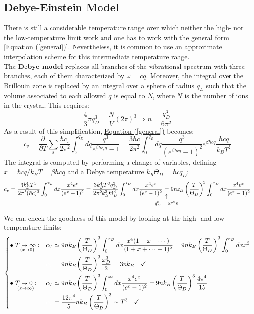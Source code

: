 \documentclass[10.75pt,a4paper,openright,bottom=2cm]{article}
\begin{document}
\subsection{Debye-Einstein Model}
There is still a considerable temperature range over which neither the high- nor the low-temperature limit work and one has to work with the general form [\hyperref[general]{Equation (\ref{general})}]. Nevertheless, it is common to use an approximate interpolation scheme for this intermediate temperature range.\\
The \textbf{Debye model} replaces all branches of the vibrational spectrum with three branches, each of them characterized by $\omega=cq$. Moreover, the integral over the  Brillouin zone is replaced by an integral over a sphere of radius $q_D$ such that the volume associated to each allowed $q$ is equal to $N$, where $N$ is the number of ions in the crystal. This requires:
\[
\frac{4}{3}\pi q_D^3=\frac{N}{V}(2\pi)^3\Rightarrow n=\frac{q_D^3}{6\pi^2}
\]
As a result of this simplification, \hyperref[general]{Equation (\ref{general})} becomes:
\[
c_v=\frac{\partial}{\partial T}\sum_s\frac{\hbar c_s}{2\pi^2}\int_0^{q_D}dq\frac{q^3}{e^{\beta\hbar c_sq}-1}=\frac{3\hbar c}{2\pi^2}\int_0^{q_D}dq\frac{q^3}{(e^{\beta\hbar cq}-1)^2}e^{\beta\hbar cq}\frac{\hbar cq}{k_BT^2}
\]
The integral is computed by performing a change of variables, defining $x=\hbar cq/k_BT=\beta\hbar cq$ and a Debye temperature $k_B\Theta_D=\hbar cq_D$:
\[
c_v=\frac{3k_B^4T^3}{2\pi^2(\hbar c)^3}\int_0^{x_D}dx\frac{x^4e^x}{(e^x-1)^2}=\frac{3k_B^4T^3q_D^3}{2\pi^2k_B^3\Theta_D^3}\int_0^{x_D}dx\frac{x^4e^x}{(e^x-1)^2}\underset{\mathclap{\tikz \node {$\uparrow$} node [below=1ex] {\footnotesize $q_D^3=6\pi^2n$};}}{=}9nk_B\left(\frac{T}{\Theta_D}\right)^3\int_0^{x_D}dx\frac{x^4e^x}{(e^x-1)^2}
\]
We can check the goodness of this model by looking at the high- and low-temperature limits:
\[
\left\{
\begin{aligned}
&\bullet\underset{(x\to0)}{T\to\infty:}&&c_V\simeq9nk_B\left(\frac{T}{\Theta_D}\right)^3\int_0^{x_D}dx\frac{x^4(1+x+\cdots)}{(1+x+\cdots-1)^2}=9nk_B\left(\frac{T}{\Theta_D}\right)^3\int_0^{x_D}dxx^2\\
& &&{\color{white}{c_V}}=9nk_B\left(\frac{T}{\Theta_D}\right)^3\frac{x_D^3}{3}=3nk_B \quad \checkmark\\
&\bullet\underset{(x\to\infty)}{T\to0:}&&c_V\simeq9nk_B\left(\frac{T}{\Theta_D}\right)^3\int_0^\infty dx\frac{x^4e^x}{(e^x-1)^2}=9nk_B\left(\frac{T}{\Theta_D}\right)^3\frac{4\pi^4}{15}\\
& &&{\color{white}{c_V}}=\frac{12\pi^4}{5}nk_B\left(\frac{T}{\Theta_D}\right)^3\sim T^3 \quad \checkmark
\end{aligned}
\right.
\]
\end{document}
